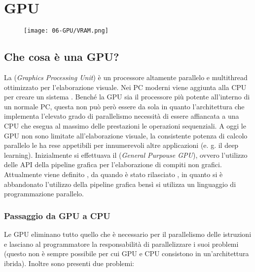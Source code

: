 \chapter{GPU}

\begin{figure}[h]
    \centering
    \texttt{[image: 06-GPU/VRAM.png]}
\end{figure}

\section{Che cosa è una GPU?}

La  (\textit{Graphics Processing Unit}) è un processore altamente parallelo e multithread ottimizzato per l'elaborazione visuale. Nei PC moderni viene aggiunta alla CPU per creare un sistema . Benché la GPU sia il processore più potente all'interno di un normale PC, questa non può però essere da sola in quanto l'architettura che implementa l'elevato grado di parallelismo necessità di essere affiancata a una CPU che esegua al massimo delle prestazioni le operazioni sequenziali. 
A oggi le GPU non sono limitate all'elaborazione visuale, la consistente potenza di calcolo parallelo le ha rese appetibili per innumerevoli altre applicazioni (e. g. il deep learning). 
Inizialmente si effettuava il  (\textit{General Purpouse GPU}), ovvero l'utilizzo delle API della pipeline grafica per l'elaborazione di compiti non grafici. Attualmente viene definito , da quando  è stato rilasciato , in quanto si è abbandonato l'utilizzo della pipeline grafica bensì si utilizza un linguaggio di programmazione parallelo.



\subsection{Passaggio da GPU a CPU}

Le GPU eliminano tutto quello che è necessario per il parallelismo delle istruzioni e lasciano al programmatore la responsabilità di parallelizzare i suoi problemi (questo non è sempre possibile per cui GPU e CPU consistono in un'architettura ibrida). Inoltre sono presenti due problemi: 

